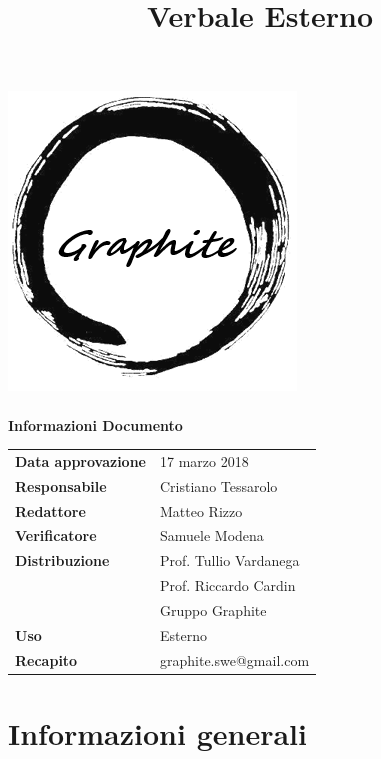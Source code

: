 \documentclass[openany,12pt,a4paper]{article}
\title{Verbale Esterno}
\author{}
\begin{document}
 
  \makeatletter 
  \begin{titlepage} 
    \setlength{\headsep}{0pt}   
    \begin{center} 
      \includegraphics[width=0.5\linewidth]{Logo.png}\\[1em] 
      {\huge \bfseries  \@title }\\[10ex] 
      \textbf{\Large Informazioni Documento} \\[2em] 
      \bgroup 
      \def\arraystretch{1.5} 
      \begin{tabular}{l|l} 
        \textbf{Data approvazione} & 17 marzo 2018 \\ 
        \textbf{Responsabile} & Cristiano Tessarolo \\ 
        \textbf{Redattore} & Matteo Rizzo \\ 
        \textbf{Verificatore} & Samuele Modena \\ 
        \textbf{Distribuzione} & Prof. Tullio Vardanega \\ 
         & Prof. Riccardo Cardin \\ 
         & Gruppo Graphite \\ 
        \textbf{Uso} & Esterno \\ 
        \textbf{Recapito} & graphite.swe@gmail.com \\ 
      \end{tabular} 
    \egroup 
    \end{center} 
  \end{titlepage} 
  \makeatother 
 
  \thispagestyle{empty} 
  \newpage 
   
  \tableofcontents 
  \newpage 
   
  \section{Informazioni generali} 
   
\end{document}
